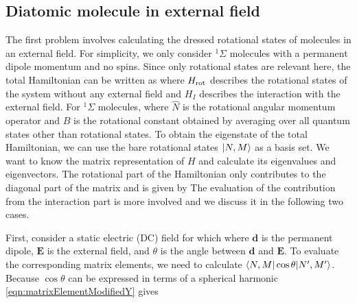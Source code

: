 \subsection{Diatomic molecule in external field}
\label{sec:moleculeInField}
The first problem involves calculating the dressed rotational states of molecules in an external field. For simplicity, we 
only consider $^1\Sigma$ molecules with a permanent dipole momentum and no spins. Since only rotational states are
relevant here, the total Hamiltonian can be written as
where $H_{\rm rot} $ describes the rotational states of the system without any external field 
and $H_{I}$ describes the interaction with the external field. For $^1\Sigma$ molecules,  
where $\hat{N}$ is the rotational angular momentum operator and $B$ is the rotational constant obtained by averaging 
over all quantum states other than rotational states. To obtain the eigenstate of the total Hamiltonian, we can use the
bare rotational states $| N, M \rangle$ as a basis set.  We want to know the matrix representation of $H$ and calculate its 
eigenvalues and eigenvectors. The rotational part of the Hamiltonian only contributes to the diagonal part of the matrix 
and is given by
The evaluation of the contribution from the interaction part is more involved and we discuss it in the following two 
cases.

First, consider a static electric (DC) field for which
where $\mathbf{d}$ is the permanent dipole, $\mathbf{E}$ is the external field, and $\theta$ is the 
angle between $\mathbf{d}$ and $\mathbf{E}$. To evaluate the corresponding matrix elements, we need to 
calculate $\langle N, M | \cos\theta | N^{\prime}, M^{\prime} \rangle$. Because $\cos\theta$ can be expressed
in terms of a spherical harmonic
\autoref{eqn:matrixElementModifiedY} gives

